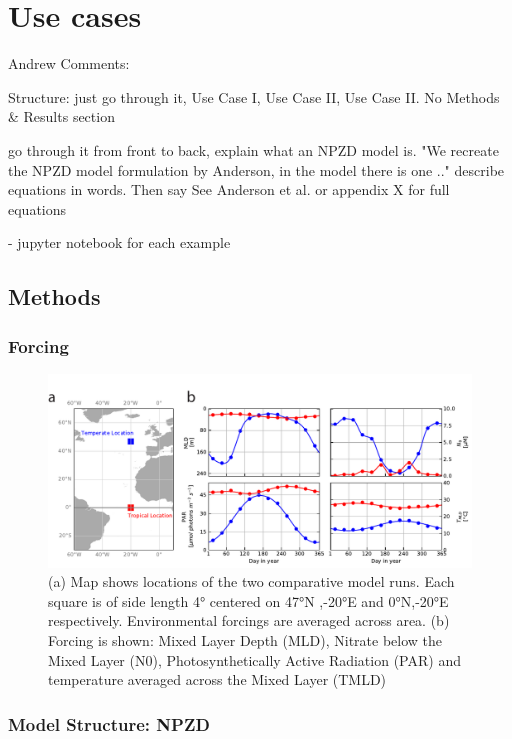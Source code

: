 \documentclass[journal abbreviation, manuscript]{copernicus}
\begin{document}
\section{Use cases}
Andrew Comments:

Structure: just go through it, Use Case I, Use Case II, Use Case II. No Methods & Results section

go through it from front to back, explain what an NPZD model is.
"We recreate the NPZD model formulation by Anderson, in the model there is one .." describe equations in words. Then say See Anderson et al. or appendix X for full equations



- jupyter notebook for each example

\subsection{Methods}
\subsubsection{Forcing}
\begin{figure}[t]
\includegraphics[width=15cm]{Figures/firstdraft_plots/01_forcing_labeled.pdf}
\caption{(a) Map shows locations of the two comparative model runs. Each square is of side length 4° centered on 47°N ,-20°E and 0°N,-20°E respectively. Environmental forcings are averaged across area. (b) Forcing is shown: Mixed Layer Depth (MLD), Nitrate below the Mixed Layer (N0),
Photosynthetically Active Radiation (PAR) and temperature averaged across the Mixed Layer (TMLD)}
\label{phydraforcing}
\end{figure}


\subsubsection{Model Structure: NPZD}
\end{document}
